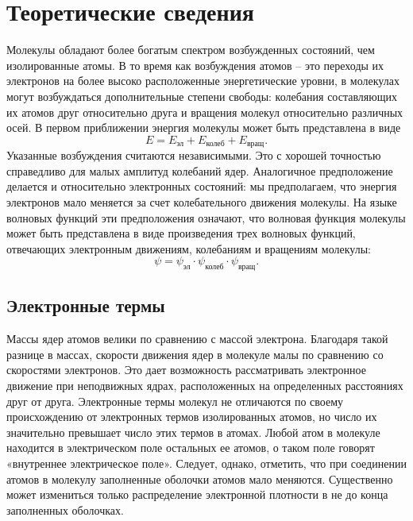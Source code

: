 \documentclass[a4paper,12pt]{article}
\begin{document}
\section{Теоретические сведения}
Молекулы обладают более богатым спектром возбужденных состояний, чем изолированные атомы. В то время как возбуждения атомов -- это переходы их электронов на более высоко расположенные энергетические уровни, в молекулах могут возбуждаться дополнительные степени свободы: колебания составляющих их атомов друг относительно друга и вращения молекул относительно различных осей. В первом приближении энергия молекулы может быть представлена в виде
\begin{equation}\label{eq: Energy in molecule}
    E = E_\text{эл} + E_\text{колеб} + E_\text{вращ}. 
\end{equation}
Указанные возбуждения считаются независимыми. Это с хорошей точностью справедливо для малых амплитуд колебаний ядер. Аналогичное предположение делается и относительно электронных состояний: мы предполагаем, что энергия электронов мало меняется за счет колебательного движения молекулы. На языке волновых функций эти предположения означают, что волновая функция молекулы может быть представлена в виде произведения трех волновых функций, отвечающих электронным движениям, колебаниям и вращениям молекулы:
\begin{equation}\label{eq: Psi-func in molecule}
    \psi = \psi_\text{эл}\cdot\psi_\text{колеб}\cdot\psi_\text{вращ}. 
\end{equation}

\subsection{Электронные термы}
Массы ядер атомов велики по сравнению с массой электрона. Благодаря такой разнице в массах, скорости движения ядер в молекуле малы по сравнению со скоростями электронов. Это дает возможность рассматривать электронное движение при неподвижных ядрах, расположенных на определенных расстояниях друг от друга. Электронные термы молекул не отличаются по своему происхождению от электронных термов изолированных атомов, но число их значительно превышает число этих термов в атомах. Любой атом в молекуле находится в электрическом поле остальных ее атомов, о таком поле говорят «внутреннее электрическое поле». Следует, однако, отметить, что при соединении атомов в молекулу заполненные оболочки атомов мало меняются. Существенно может измениться только распределение электронной плотности в не до конца заполненных оболочках.
\end{document}
